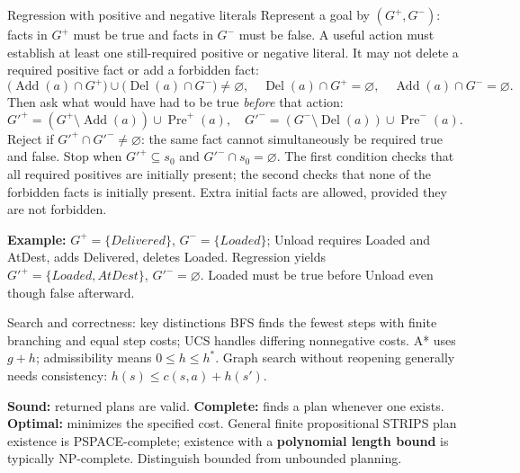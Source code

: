 \documentclass[10pt,a4paper]{article}
\newcommand{\Pre}{\operatorname{Pre}}
\newcommand{\Add}{\operatorname{Add}}
\newcommand{\Del}{\operatorname{Del}}
\begin{document}
\begin{card}{Regression with positive and negative literals}
Represent a goal by $(G^+,G^-)$: facts in $G^+$ must be true and facts in $G^-$ must be false. A useful action must establish at least one still-required positive or negative literal. It may not delete a required positive fact or add a forbidden fact:
\[
\bigl(\Add(a)\cap G^+\bigr)\cup\bigl(\Del(a)\cap G^-\bigr)\ne\varnothing,
\quad \Del(a)\cap G^+=\varnothing,\quad \Add(a)\cap G^-=\varnothing.
\]
Then ask what would have had to be true \emph{before} that action:
\[
G'^+=(G^+\setminus\Add(a))\cup\Pre^+(a),\quad
G'^-=(G^-\setminus\Del(a))\cup\Pre^-(a).
\]
Reject if $G'^+\cap G'^-\ne\varnothing$: the same fact cannot simultaneously be required true and false. Stop when $G'^+\subseteq s_0$ and $G'^-\cap s_0=\varnothing$. The first condition checks that all required positives are initially present; the second checks that none of the forbidden facts is initially present. Extra initial facts are allowed, provided they are not forbidden.

\textbf{Example:} $G^+=\{Delivered\}$, $G^-=\{Loaded\}$; Unload requires Loaded and AtDest, adds Delivered, deletes Loaded. Regression yields $G'^+=\{Loaded,AtDest\}$, $G'^-=\varnothing$. Loaded must be true before Unload even though false afterward.
\end{card}

\begin{card}{Search and correctness: key distinctions}
BFS finds the fewest steps with finite branching and equal step costs; UCS handles differing nonnegative costs. A* uses $g+h$; admissibility means $0\le h\le h^*$. Graph search without reopening generally needs consistency: $h(s)\le c(s,a)+h(s')$.

\textbf{Sound:} returned plans are valid. \textbf{Complete:} finds a plan whenever one exists. \textbf{Optimal:} minimizes the specified cost. General finite propositional STRIPS plan existence is PSPACE-complete; existence with a \textbf{polynomial length bound} is typically NP-complete. Distinguish bounded from unbounded planning.
\end{card}
\end{document}
